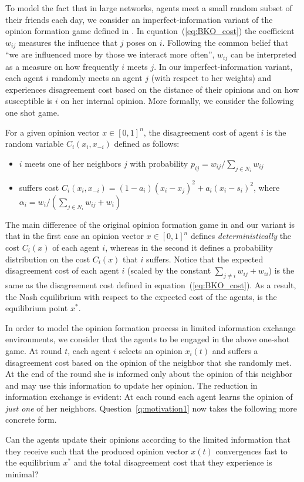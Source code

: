 To model the fact that in large networks, agents meet a small random subset of
their friends each day, we consider an imperfect-information variant of the
opinion formation game defined in \cite{BKO11}. In equation~(\ref{eq:BKO_cost})
the coefficient $w_{ij}$ measures the influence that $j$ poses on $i$.
Following the common belief that \enquote{we are influenced more by
those we interact more often}, $w_{ij}$ can be interpreted as
a measure on how frequently $i$ meets $j$. In our imperfect-information
variant, each agent $i$ randomly meets an agent $j$ (with respect to her weights)
and experiences disagreement cost based on the distance of their opinions and on
how susceptible is $i$ on her internal opinion. More formally, we consider the
following one shot game.
%
\begin{definition}\label{d:random_game}
  For a given opinion vector $x \in [0,1]^n$, the disagreement cost of agent $i$
  is the random variable $C_i(x_i,x_{-i})$ defined as follows:
  \begin{itemize}
    \item $i$ meets one of her neighbors $j$ with probability
      $p_{ij}= w_{ij}/\sum_{j\in N_i}w_{ij}$
    \item suffers cost $C_i(x_i , x_{-i}) = (1-a_i)(x_i-x_j)^2 + a_i(x_i-s_i)^2$,
      where $\alpha_i = w_i/(\sum_{j\in N_i}w_{ij}+w_i)$
  \end{itemize}
\end{definition}
%
The main difference of the original opinion formation game in \cite{BKO11}
and our variant is that in the first case an opinion vector $x\in [0,1]^n$ defines
\emph{deterministically} the cost $C_i(x)$ of each agent $i$,
whereas in the second it defines a probability distribution on the cost
$C_i(x)$ that $i$ suffers. Notice that the expected
disagreement cost of each agent $i$ (scaled by the constant $\sum_{j\neq i}w_{ij}+w_{ii}$)
is the same as the disagreement cost defined in equation~(\ref{eq:BKO_cost}).
As a result, the Nash equilibrium with respect to the expected cost of the agents,
is the equilibrium point $x^*$.

In order to model the opinion formation process in limited information
exchange environments, we consider that the agents to be engaged in the
above one-shot game. At round $t$, each agent $i$ selects an opinion
$x_i(t)$ and suffers a disagreement cost based on the opinion
of the neighbor that she randomly met. At the end of the round she is
informed only about the opinion of this neighbor and may use this information
to update her opinion. The reduction in information exchange is evident:
At each round each agent learns the opinion of \emph{just one} of her neighbors.
Question~\ref{q:motivation1} now takes the following more concrete form.
\begin{question}\label{q:motivation2}
Can the agents update their opinions according to the
limited information that they receive such that the produced opinion vector
$x(t)$ convergences fast to the equilibrium $x^*$ and the total disagreement cost
that they experience is minimal?
\end{question}

